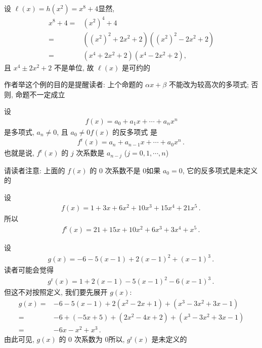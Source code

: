 \begin{remark}
    设 $\ell (x) = h(x^2) = x^8 + 4$\period 显然,
    \begin{align*}
        x^8 + 4
        = {} & (x^2)^4 + 4                               \\
        = {} & ((x^2)^2 + 2x^2 + 2) ((x^2)^2 - 2x^2 + 2) \\
        = {} & (x^4 + 2x^2 + 2) (x^4 - 2x^2 + 2),
    \end{align*}
    且 $x^4 \pm 2x^2 + 2$ 不是单位, 故 $\ell (x)$ 是可约的\period

    作者举这个例的目的是提醒读者: 上个命题的 $\alpha x + \beta$ 不能改为较高次的多项式; 否则, 命题不一定成立\period
\end{remark}

\begin{definition}
    设
    \begin{align*}
        f(x) = a_0 + a_1 x + \cdots + a_n x^n
    \end{align*}
    是多项式, $a_n \neq 0$, 且 $a_0 \neq 0$\period $f(x)$ 的反多项式  是
    \begin{align*}
        f^{\mathrm{r}} (x) = a_n + a_{n-1} x + \cdots + a_0 x^n \period
    \end{align*}
    也就是说, $f^{\mathrm{r}} (x)$ 的 $j$ 次系数是 $a_{n-j}$ ($j = 0,1,\cdots,n$)\period

    请读者注意: 上面的 $f(x)$ 的 $0$ 次系数不是 $0$\period 如果 $a_0 = 0$, 它的反多项式是未定义的\period
\end{definition}

\begin{example}
    设
    \begin{align*}
        f(x) = 1 + 3x + 6x^2 + 10x^3 + 15x^4 + 21x^5 \period
    \end{align*}
    所以
    \begin{align*}
        f^{\mathrm{r}} (x) = 21 + 15x + 10x^2 + 6x^3 + 3x^4 + x^5 \period
    \end{align*}
\end{example}

\begin{example}
    设
    \begin{align*}
        g(x) = -6 - 5 (x - 1) + 2 (x - 1)^2 + (x - 1)^3 \period
    \end{align*}
    读者可能会觉得
    \begin{align*}
        g^{\mathrm{r}} (x) = 1 + 2 (x - 1) - 5 (x - 1)^2 - 6 (x - 1)^3 \period
    \end{align*}
    但这不对\period 按照定义, 我们要先展开 $g(x)$:
    \begin{align*}
        g(x)
        = {} & -6 - 5(x - 1) + 2 (x^2 - 2x + 1) + (x^3 - 3x^2 + 3x - 1) \\
        = {} & -6 + (-5x + 5) + (2x^2 - 4x + 2) + (x^3 - 3x^2 + 3x - 1) \\
        = {} & -6x - x^2 + x^3 \period
    \end{align*}
    由此可见, $g(x)$ 的 $0$ 次系数为 $0$\period 所以, $g^{\mathrm{r}} (x)$ 是未定义的\period
\end{example}

